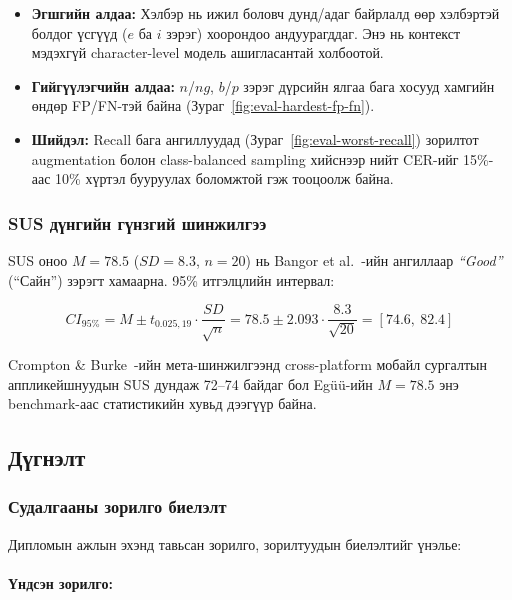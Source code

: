 \begin{itemize}
  \item \textbf{Эгшгийн алдаа:} Хэлбэр нь ижил боловч дунд/адаг байрлалд өөр хэлбэртэй болдог үсгүүд ($e$ ба $i$ зэрэг) хоорондоо андуурагддаг. Энэ нь контекст мэдэхгүй character-level модель ашигласантай холбоотой.
  \item \textbf{Гийгүүлэгчийн алдаа:} $n$/$ng$, $b$/$p$ зэрэг дүрсийн ялгаа бага хосууд хамгийн өндөр FP/FN-тэй байна (Зураг~\ref{fig:eval-hardest-fp-fn}).
  \item \textbf{Шийдэл:} Recall бага ангиллуудад (Зураг~\ref{fig:eval-worst-recall}) зорилтот augmentation болон class-balanced sampling хийснээр нийт CER-ийг 15\%-аас 10\% хүртэл бууруулах боломжтой гэж тооцоолж байна.
\end{itemize}

\subsubsection{SUS дүнгийн гүнзгий шинжилгээ}

SUS оноо $M=78.5$ ($SD=8.3$, $n=20$) нь Bangor et al.~\cite{bangor2009determining}-ийн ангиллаар \textit{``Good''} (``Сайн'') зэрэгт хамаарна. 95\% итгэлцлийн интервал:

\begin{equation}
CI_{95\%} = M \pm t_{0.025,19} \cdot \frac{SD}{\sqrt{n}} = 78.5 \pm 2.093 \cdot \frac{8.3}{\sqrt{20}} = [74.6,\ 82.4]
\end{equation}

Crompton \& Burke~\cite{crompton2021mobile}-ийн мета-шинжилгээнд cross-platform мобайл сургалтын аппликейшнуудын SUS дундаж 72--74 байдаг бол Egüü-ийн $M=78.5$ энэ benchmark-аас статистикийн хувьд дээгүүр байна.

\subsection{Дүгнэлт}
\label{subsec:conclusion}

\subsubsection{Судалгааны зорилго биелэлт}
\label{subsec:objectives-achievement}

Дипломын ажлын эхэнд тавьсан зорилго, зорилтуудын биелэлтийг үнэлье:

\paragraph{Үндсэн зорилго:}

